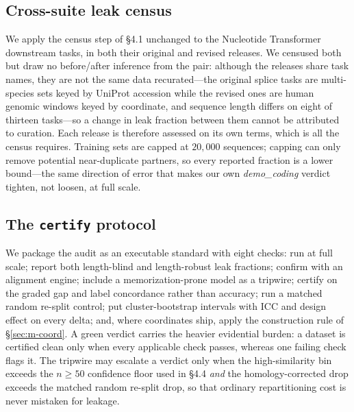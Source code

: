 \subsection{Cross-suite leak census}\label{sec:m-census}
We apply the census step of \S4.1 unchanged to the Nucleotide Transformer downstream tasks, in both their original and revised releases. We censused both but draw no before/after inference from the pair: although the releases share task names, they are not the same data recurated---the original splice tasks are multi-species sets keyed by UniProt accession while the revised ones are human genomic windows keyed by coordinate, and sequence length differs on eight of thirteen tasks---so a change in leak fraction between them cannot be attributed to curation. Each release is therefore assessed on its own terms, which is all the census requires. Training sets are capped at $20{,}000$ sequences; capping can only remove potential near-duplicate partners, so every reported fraction is a lower bound---the same direction of error that makes our own \textit{demo\_coding} verdict tighten, not loosen, at full scale.

\subsection{The \texttt{certify} protocol}\label{sec:m-certify}
We package the audit as an executable standard with eight checks: run at full scale; report both length-blind and length-robust leak fractions; confirm with an alignment engine; include a memorization-prone model as a tripwire; certify on the graded gap and label concordance rather than accuracy; run a matched random re-split control; put cluster-bootstrap intervals with ICC and design effect on every delta; and, where coordinates ship, apply the construction rule of \S\ref{sec:m-coord}. A green verdict carries the heavier evidential burden: a dataset is certified clean only when every applicable check passes, whereas one failing check flags it. The tripwire may escalate a verdict only when the high-similarity bin exceeds the $n\ge50$ confidence floor used in \S4.4 \emph{and} the homology-corrected drop exceeds the matched random re-split drop, so that ordinary repartitioning cost is never mistaken for leakage.


